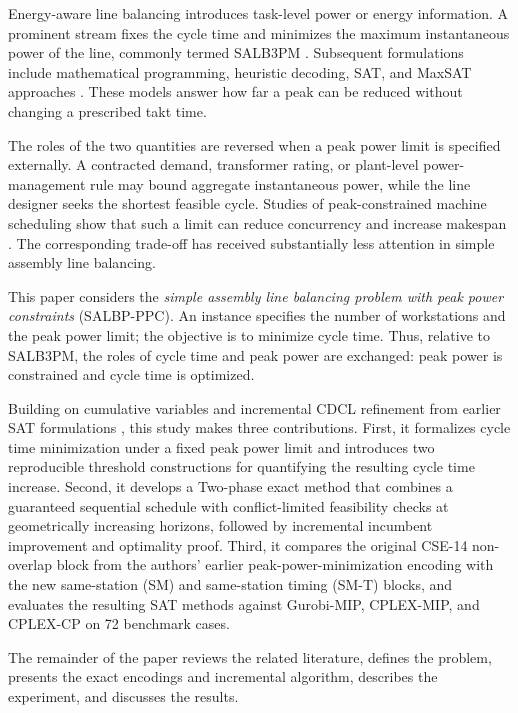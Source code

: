 \documentclass[]{interact}
\theoremstyle{plain}
\theoremstyle{definition}
\theoremstyle{remark}
\newcommand{\Problem}{SALBP-PPC}
\begin{document}
Energy-aware line balancing introduces task-level power or energy information. A prominent stream fixes the cycle time and minimizes the maximum instantaneous power of the line, commonly termed SALB3PM \citep{Gianessi2019Simple}. Subsequent formulations include mathematical programming, heuristic decoding, SAT, and MaxSAT approaches \citep{Delorme2023A,Py2024POS,Zheng2024Optimizing,VanKieu2025Compact}. These models answer how far a peak can be reduced without changing a prescribed takt time.

The roles of the two quantities are reversed when a peak power limit is specified externally. A contracted demand, transformer rating, or plant-level power-management rule may bound aggregate instantaneous power, while the line designer seeks the shortest feasible cycle. Studies of peak-constrained machine scheduling show that such a limit can reduce concurrency and increase makespan \citep{Fang2013Flow,Lv2024Considering,Chou2020An,Carlucci2021A,Li2024Energy-efficient}. The corresponding trade-off has received substantially less attention in simple assembly line balancing.

This paper considers the \emph{simple assembly line balancing problem with peak power constraints} (\Problem). An instance specifies the number of workstations and the peak power limit; the objective is to minimize cycle time. Thus, relative to SALB3PM, the roles of cycle time and peak power are exchanged: peak power is constrained and cycle time is optimized.

Building on cumulative variables and incremental CDCL refinement from earlier SAT formulations \citep{Py2024POS,VanKieu2025Compact}, this study makes three contributions. First, it formalizes cycle time minimization under a fixed peak power limit and introduces two reproducible threshold constructions for quantifying the resulting cycle time increase. Second, it develops a Two-phase exact method that combines a guaranteed sequential schedule with conflict-limited feasibility checks at geometrically increasing horizons, followed by incremental incumbent improvement and optimality proof. Third, it compares the original CSE-14 non-overlap block from the authors' earlier peak-power-minimization encoding with the new same-station (SM) and same-station timing (SM-T) blocks, and evaluates the resulting SAT methods against Gurobi-MIP, CPLEX-MIP, and CPLEX-CP on 72 benchmark cases.

The remainder of the paper reviews the related literature, defines the problem, presents the exact encodings and incremental algorithm, describes the experiment, and discusses the results.
\end{document}
